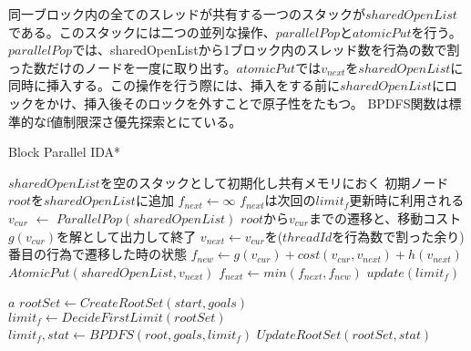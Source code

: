 \documentclass[a4paper,11pt,oneside,openany]{jsbook}
\begin{document}
同一ブロック内の全てのスレッドが共有する一つのスタックが$sharedOpenList$である。このスタックには二つの並列な操作、$parallelPop$と$atomicPut$を行う。$parallelPop$では、sharedOpenListから1ブロック内のスレッド数を行為の数で割った数だけのノードを一度に取り出す。$atomicPut$では$v_{next}$を$sharedOpenList$に同時に挿入する。この操作を行う際には、挿入をする前に$sharedOpenList$にロックをかけ、挿入後そのロックを外すことで原子性をたもつ。
BPDFS関数は標準的なf値制限深さ優先探索とにている。


\newpage
\begin{algorithm}
\caption{Block Parallel IDA*}
\label{alg:pbnf}
\begin{algorithmic}[1]
    \State $sharedOpenList$を空のスタックとして初期化し共有メモリにおく
    \State 初期ノード$root$を$sharedOpenList$に追加
    \State $f_{next} \leftarrow \infty$
    \State $f_{next}$は次回の$limit_f$更新時に利用される 
        \State $v_{cur}$ $\leftarrow$ ${ParallelPop}(sharedOpenList)$
            \State $root$から$v_{cur}$までの遷移と、移動コスト$g(v_{cur})$を解として出力して終了
        \EndIf
        \State $v_{next} \gets $$v_{cur}$を($threadId$を行為数で割った余り)番目の行為で遷移した時の状態
        \State $f_{new} \leftarrow g(v_{cur}) + cost(v_{cur}, v_{next}) + h(v_{next})$
            \State ${AtomicPut}(sharedOpenList, v_{next})$ 
        \Else
            \State $f_{next} \leftarrow min(f_{next}, f_{new})$
        \EndIf
    \EndWhile
    \State $update(limit_f)$

    \State \Return $a$
\EndFunction
{}
    \State $rootSet \gets {CreateRootSet}(start, goals)$
    \State $limit_f \leftarrow {DecideFirstLimit}(rootSet)$
            \State $limit_f, stat \gets {BPDFS}(root, goals, limit_f)$
        \EndParallelForByBlocks
        \State $UpdateRootSet(rootSet, stat)$
    \EndWhile
\EndFunction

\end{algorithmic}
\end{algorithm}
\newpage
\end{document}
